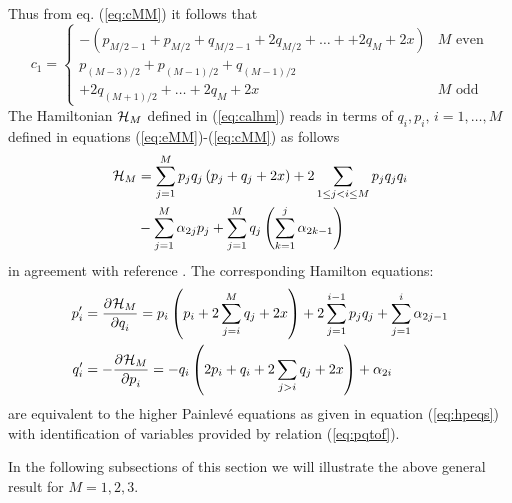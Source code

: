 \documentclass[12pt]{article}
\numberwithin{equation}{section}
\def\rf#1{(\ref{eq:#1})}
\def\lab#1{\label{eq:#1}}
\providecommand*{\pder}[3][]{%
\frac{\partial^{#1}#2}{\partial #3^{#1}}}
\begin{document}
Thus from eq. \rf{cMM} it follows that
\begin{equation}
c_1 = \begin{cases} -\left(p_{M/2-1}+p_{M/2}+q_{M/2-1} +2
q_{M/2}+{\ldots} +
+2q_M+2x\right) & \text{$M$ even}\\
p_{(M-3)/2}+p_{(M-1)/2}+q_{(M-1)/2} & \\
+2q_{(M+1)/2}+{\ldots} 
+2q_M+2x
 & \text{$M$ odd}
\end{cases}
\lab{cMM1}
\end{equation}
The Hamiltonian ${\cal H}_M$ defined in \rf{calhm} 
reads in terms of 
$q_i, p_i, \, i=1,{\ldots} ,M$ defined in equations 
\rf{eMM}-\rf{cMM} as follows
\begin{equation} 
\begin{split}
{\cal H}_M&= \sum_{j=1}^M p_j q_j  \left( p_j+q_j +2 x\right)
+2 \sum_{1\le j <i \le M} p_j q_j q_i\\
&-\sum_{j=1}^M {\alpha}_{2j} p_j + \sum_{j=1}^M q_j \left(\sum_{k=1}^j
\alpha_{2k-1}\right)
\end{split}
\lab{calhmpq}
\end{equation} 
in agreement with reference \cite{sasano}.
The corresponding Hamilton equations:
\[
\begin{split}
p_i^\prime &= \pder{{\cal H}_M}{q_i}= p_i  \left( p_i+2 \sum_{j=i}^M 
q_j +2 x\right) +2 \sum_{j=1}^{i-1} p_jq_j+\sum_{j=1}^i \alpha_{2j-1} \\
q_i^\prime &= -\pder{{\cal H}_M}{p_i}= - q_i  \left( 2p_i+q_i+2
\sum_{j>i} q_j +2 x\right) + \alpha_{2i}
\end{split}
\]
are equivalent to the higher Painlev\'e equations as given in
equation \rf{hpeqs} with identification of variables provided
by relation \rf{pqtof}.

In the following subsections of this section we will
illustrate the above general result for $M=1,2,3$.
\end{document}
